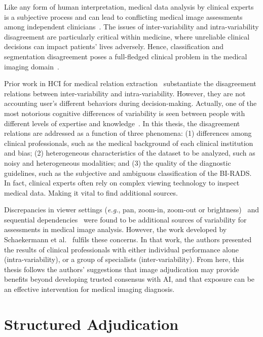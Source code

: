 Like any form of human interpretation, medical data analysis by clinical experts is a subjective process and can lead to conflicting medical image assessments among independent clinicians~\cite{NIAZI2019e253}.
The issues of inter-variability and intra-variability disagreement are particularly critical within medicine, where unreliable clinical decisions can impact patients' lives adversely.
Hence, classification and segmentation disagreement poses a full-fledged clinical problem in the medical imaging domain~\cite{schaekermann2018expert}.

Prior work in \ac{HCI} for medical relation extraction~\cite{10.1145/3152889} substantiate the disagreement relations between inter-variability and intra-variability.
However, they are not accounting user's different behaviors during decision-making.
Actually, one of the most notorious cognitive differences of variability is seen between people with different levels of expertise and knowledge~\cite{Seidel2021}.
In this thesis, the disagreement relations are addressed as a function of three phenomena:
(1) differences among clinical professionals, such as the medical background of each clinical institution and bias;
(2) heterogeneous characteristics of the dataset to be analyzed, such as noisy and heterogeneous modalities; and
(3) the quality of the diagnostic guidelines, such as the subjective and ambiguous classification of the \ac{BI-RADS}.
In fact, clinical experts often rely on complex viewing technology to inspect medical data.
Making it vital to find additional sources.

Discrepancies in viewer settings ({\it e.g.}, pan, zoom-in, zoom-out or brightness)~\cite{10.1145/3359178} and sequential dependencies~\cite{schaekermann2018expert} were found to be additional sources of variability for assessments in medical image analysis.
However, the work developed by Schaekermann et al.~\cite{10.1145/3313831.3376290} fulfils these concerns.
In that work, the authors presented the results of clinical professionals with either individual performance alone (intra-variability), or a group of specialists (inter-variability).
From here, this thesis follows the authors' suggestions that image adjudication may provide benefits beyond developing trusted consensus with \ac{AI}, and that exposure can be an effective intervention for medical imaging diagnosis.

\section{Structured Adjudication}
\label{sec:chap003006}

